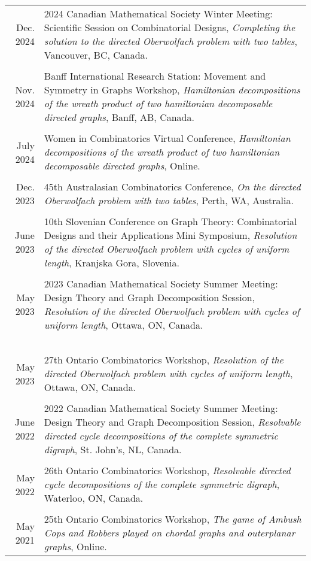 \documentclass[letter,12pt]{article} %
\begin{document}
 {\raggedleft
 \begin{longtable}{r p{13.5cm}}
 Dec. 2024 & 2024 Canadian Mathematical Society Winter Meeting: Scientific Session on Combinatorial Designs, \textit{Completing the solution to the directed Oberwolfach problem with two tables}, Vancouver, BC, Canada.\\
 &\\[-3mm]
  Nov. 2024 & Banff International Research Station: Movement and Symmetry in Graphs Workshop, \textit{Hamiltonian decompositions of the wreath product of two hamiltonian decomposable directed graphs}, Banff, AB, Canada.\\
   &\\[-3mm]
  July 2024 & Women in Combinatorics Virtual Conference, \textit{Hamiltonian decompositions of the wreath product of two hamiltonian decomposable directed graphs}, Online.\\
     &\\[-3mm]
  Dec. 2023 &45th Australasian Combinatorics Conference, \textit{On the directed Oberwolfach problem with two tables}, Perth, WA, Australia.\\
       &\\[-3mm]
  June 2023 &10th Slovenian Conference on Graph Theory: Combinatorial Designs and their Applications Mini Symposium, \textit{Resolution of the directed Oberwolfach problem with cycles of uniform length}, Kranjska Gora, Slovenia.\\
       &\\[-3mm]
  May 2023 &2023 Canadian Mathematical Society Summer Meeting: Design Theory and Graph Decomposition Session, \textit{Resolution of the directed Oberwolfach problem with cycles of uniform length}, Ottawa, ON, Canada.\\\
       &\\[-3mm]
  May 2023 &27th Ontario Combinatorics Workshop, \textit{Resolution of the directed Oberwolfach problem with cycles of uniform length}, Ottawa, ON, Canada.\\
         &\\[-3mm]
  June 2022 &2022 Canadian Mathematical Society Summer Meeting: Design Theory and Graph Decomposition Session, \textit{Resolvable directed cycle decompositions of the complete symmetric digraph}, St. John's, NL, Canada.\\
           &\\[-3mm]
May 2022 &26th Ontario Combinatorics Workshop, \textit{Resolvable directed cycle decompositions of the complete symmetric digraph}, Waterloo, ON, Canada.\\
           &\\[-3mm]
May 2021 &25th Ontario Combinatorics Workshop, \textit{The game of Ambush Cops and Robbers played on chordal graphs and outerplanar graphs}, Online.\\
 \end{longtable} 
}
\end{document}
